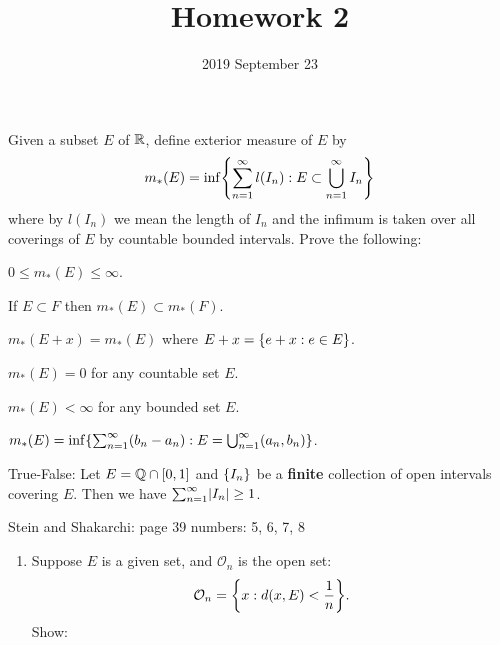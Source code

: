 \documentclass{../homework}
\title{Homework 2}
\author{}
\date{2019 September 23}
\begin{document}
\begin{problems}
\item Given a subset \(E\) of \(\mathbb R\), define exterior measure of
  \(E\) by
  \[
    m_*(E) = \inf\set*{
      \sum_{n=1}^\infty l(I_n)
      : E \subset \bigcup_{n=1}^\infty I_n
    }
  \]
  where by \(l(I_n)\) we mean the length of \(I_n\) and the infimum is
  taken over all coverings of \(E\) by countable bounded intervals.
  Prove the following:
  \begin{problems}
  \item \(0 \le m_*(E) \le \infty\).
  \item If \(E \subset F\) then \(m_*(E) \subset m_*(F)\).
  \item \(m_*(E+x) = m_*(E)\) where \(E+x = \{e+x : e \in E\}\).
  \item \(m_*(E) = 0\) for any countable set \(E\).
  \item \(m_*(E) < \infty\) for any bounded set \(E\).
  \item
    \(m_*(E) = \inf\set*{\sum_{n=1}^\infty (b_n-a_n) : E =
      \bigcup_{n=1}^\infty (a_n, b_n)}\).
  \end{problems}

  \begin{solution}
    \begin{problems}
    \item
    \item
    \item
    \item
    \item
    \item
    \end{problems}
  \end{solution}

\item True-False: Let \(E = \mathbb Q \cap [0, 1]\) and \(\{I_n\}\) be a
  \textbf{finite} collection of open intervals covering \(E\).  Then
  we have \(\sum_{n=1}^\infty \lvert I_n\rvert \ge 1\).

  \begin{solution}
  \end{solution}

\item Stein and Shakarchi: page 39 numbers: 5, 6, 7, 8

  \begin{book}
    \begin{enumerate}[start=5]
    \item Suppose \(E\) is a given set, and \(\mathcal O_n\) is the
      open set:
      \[
        \mathcal O_n = \set*{x : d(x, E) < \frac 1 n}.
      \]
      Show:
    \end{enumerate}
  \end{book}


\end{problems}
\end{document}
